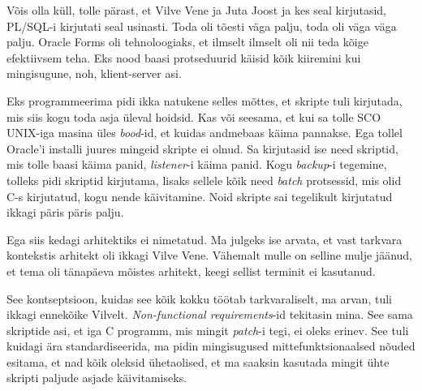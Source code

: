 
Võis olla küll, tolle pärast, et Vilve Vene ja Juta 
Joost ja kes seal kirjutasid, PL/SQL-i kirjutati seal 
usinasti. Toda oli tõesti väga palju, toda oli väga väga palju. Oracle Forms 
oli tehnoloogiaks, et ilmselt ilmselt oli nii teda kõige efektiivsem teha. Eks 
nood baasi protseduurid käisid kõik kiiremini kui mingisugune, noh, 
klient-server asi.


Eks programmeerima pidi ikka natukene selles mõttes, et skripte tuli kirjutada, 
mis  siis kogu toda asja üleval hoidsid. Kas või seesama, et kui sa tolle SCO 
UNIX-iga masina üles \emph{bood}-id, et kuidas andmebaas käima pannakse. Ega 
tollel Oracle'i installi juures mingeid skripte ei olnud. Sa kirjutasid ise 
need skriptid, mis tolle baasi käima panid, \emph{listener}-i käima panid. Kogu 
\emph{backup}-i tegemine, tolleks pidi skriptid kirjutama, lisaks sellele kõik 
need \emph{batch} protsessid, mis olid C-s kirjutatud, kogu nende käivitamine. 
Noid skripte  sai tegelikult kirjutatud ikkagi päris päris palju.


Ega siis kedagi arhitektiks ei nimetatud. Ma julgeks ise arvata, et vast 
tarkvara kontekstis arhitekt oli ikkagi Vilve Vene. 
Vähemalt  mulle on selline mulje jäänud, et tema oli tänapäeva mõistes 
arhitekt, keegi sellist terminit ei kasutanud. 

See kontseptsioon, kuidas see kõik kokku töötab tarkvaraliselt, ma arvan, tuli 
ikkagi ennekõike Vilvelt. \emph{Non-functional requirements}-id tekitasin mina. 
See sama skriptide asi, et iga  C programm, mis mingit \emph{patch}-i tegi, ei 
oleks erinev. See tuli kuidagi ära standardiseerida,  ma pidin mingisugused  
mittefunktsionaalsed nõuded esitama, et nad kõik oleksid ühetaolised, et ma 
saaksin kasutada mingit ühte skripti paljude asjade käivitamiseks.


